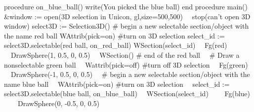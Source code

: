 \documentclass[letterpaper]{article}
\begin{document}
{\sffamily
procedure on\_blue\_ball()\newline
 write({\textquotedbl}You picked the blue ball{\textquotedbl})\newline
end\newline
\newline
procedure main()\newline
 \&window := open({\textquotedbl}3D selection in Unicon{\textquotedbl},
{\textquotedbl}gl{\textquotedbl},{\textquotedbl}size=500,500{\textquotedbl}) {\textbar}\newline
\ \  stop({\textquotedbl}can't open 3D window{\textquotedbl}) \newline
 select3D := Selection3D()\newline
 \# begin a new selectable section/object with the name {\textquotedbl}red ball{\textquotedbl}\newline
 WAttrib({\textquotedbl}pick=on{\textquotedbl}) \#turn on 3D selection \newline
 select\_id := select3D.selectable({\textquotedbl}red ball{\textquotedbl}, on\_red\_ball) \newline
 WSection(select\_id)\newline
 \ \ Fg({\textquotedbl}red{\textquotedbl})\newline
 \ \ DrawSphere(1, 0.5, 0, 0.5)\newline
 \ \ WSection() \# end of the red ball \newline
\newline
 \ \ \# Draw a nonselectable green ball\newline
 \ \ Wattrib({\textquotedbl}pick=off{\textquotedbl}) \#turn off 3D selection\newline
 \ \ Fg({\textquotedbl}green{\textquotedbl})\newline
 \ \ DrawSphere(-1, 0.5, 0, 0.5) \newline
\newline
 \ \ \# begin a new selectable section/object with the name {\textquotedbl}blue ball{\textquotedbl} \newline
 \ \ WAttrib({\textquotedbl}pick=on{\textquotedbl}) \#turn on 3D selection\newline
 \ \ select\_id := select3D.selectable({\textquotedbl}blue ball{\textquotedbl}, on\_blue\_ball)\newline
 \ \ WSection(select\_id)\newline
 \ \ \ \ Fg({\textquotedbl}blue{\textquotedbl})\newline
 \ \ \ \ DrawSphere(0, -0.5, 0, 0.5)\newline
}
\end{document}

